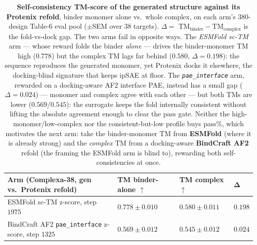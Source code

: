 \documentclass[11pt]{article}
\newcommand{\ttk}[1]{\texttt{\small #1}}
\begin{document}
\begin{table}[htbp]
\centering
{\renewcommand{\arraystretch}{1.3}%
\begin{tabular}{@{}>{\raggedright\arraybackslash}p{6.4cm}
                    >{\centering\arraybackslash}p{3.0cm}
                    >{\centering\arraybackslash}p{3.0cm}
                    >{\centering\arraybackslash}p{2.0cm}@{}}
\toprule
\textbf{Arm (Complexa-38, gen vs.\ Protenix refold)} & \textbf{TM binder-alone} $\uparrow$ & \textbf{TM complex} $\uparrow$ & $\boldsymbol{\Delta}$ \\
\midrule
ESMFold sc-TM z-score, step $1975$      & $\mathbf{0.778}\pm0.010$ & $\mathbf{0.580}\pm0.011$ & $0.198$\\
BindCraft AF2 \ttk{pae\_interface} z-score, step $1325$ & $0.569\pm0.012$ & $0.545\pm0.012$ & $\mathbf{0.024}$\\
\bottomrule
\end{tabular}}
\caption{\textbf{Self-consistency TM-score of the generated structure against its Protenix refold},
binder monomer alone vs.\ whole complex, on each arm's $380$-design Table-6 eval pool
($\pm$SEM over $38$ targets). $\Delta=$ TM$_{\text{binder}}-$TM$_{\text{complex}}$ is the fold-vs-dock
gap. The two arms fail in opposite ways. The \emph{ESMFold sc-TM} arm --- whose reward folds the binder
\emph{alone} --- drives the binder-monomer TM high ($0.778$) but the complex TM lags far behind
($0.580$, $\Delta=0.198$): the sequence reproduces the generated monomer, yet Protenix docks it
elsewhere, the docking-blind signature that keeps ipSAE at floor. The \emph{\ttk{pae\_interface}} arm,
rewarded on a docking-aware AF2 interface PAE, instead has a small gap ($\Delta=0.024$) --- monomer and
complex agree with each other --- but both TMs are lower ($0.569$/$0.545$): the surrogate keeps the fold
internally consistent without lifting the absolute agreement enough to clear the pass gate. Neither the
high-monomer/low-complex nor the consistent-but-low profile buys pass\%, which motivates the next arm:
take the binder-monomer TM from \textbf{ESMFold} (where it is already strong) and the \emph{complex} TM
from a docking-aware \textbf{BindCraft AF2} refold (the framing the ESMFold arm is blind to), rewarding
both self-consistencies at once.}
\label{tab:sctmselfconsist}
\end{table}
\end{document}
